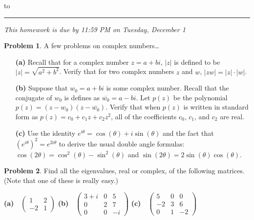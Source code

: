 \documentclass[11pt]{article}
\theoremstyle{definition}
\newtheorem{problem}{Problem}
\newenvironment{answer}{\par\bigskip\bgroup\color{darkblue}}{\egroup}
\begin{document}
\hbox to 
\nointerlineskip
\vskip 2pt
\hrule height 1pt

\medskip

\centerline{\textit{This homework is due by 11:59 PM on Tuesday, December 1}}

\medskip



\begin{problem} %
A few problems on complex numbers\dots
\begin{itemize}
\item[\bf(a)] 
   Recall that for a complex number $z=a+bi$, $|z|$ is defined to be
   $|z|=\sqrt{a^2+b^2}$.  Verify that for two complex numbers $z$ and
   $w$, $|zw| = |z|\cdot|w|$.
\item[\bf(b)] 
   Suppose that $w_0=a+bi$ is some complex number.  Recall that the
   conjugate of $w_0$ is defines as $\overline{w_0}=a-bi$.  
   Let $p(z)$ be the polynomial $p(z) = (z-w_0)(z-\overline{w_0})$.
   Verify that when $p(z)$ is written in standard form as
   $p(z) = c_0 + c_1z + c_2z^2$, all of the coefficients $c_0$,
   $c_1$, and $c_2$ are real.
\item[\bf(c)] 
   Use the identity $e^{i\theta}=\cos(\theta) + i \sin(\theta)$ and the fact that
   $(e^{i\theta})^2 = e^{2i\theta}$ to derive the usual double angle formulas:
   $\cos(2\theta)=\cos^2(\theta)-\sin^2(\theta)$ and 
   $\sin(2\theta)=2\sin(\theta)\cos(\theta)$. 
\end{itemize}
\end{problem}

\begin{answer}
\end{answer}



\begin{problem} %
Find all the eigenvalues, real or complex, of the following matrices.  (Note that
one of these is really easy.)

\bigskip
\centerline{
  \textbf{(a)}\ \ $\begin{pmatrix} 1 & 2 \\ -2 & 1  \end{pmatrix}$\qquad\qquad
  \textbf{(b)}\ \ $\begin{pmatrix} 3+i & 0 & 5\\ 0 & 2 & 7\\ 0 & 0 & -i  \end{pmatrix}$\qquad\qquad
  \textbf{(c)}\ \ $\begin{pmatrix}  5 & 0 & 0 \\ -2 & 3 & 6\\ 0 & 1 & -2  \end{pmatrix}$
}
\end{problem}
\end{document}

